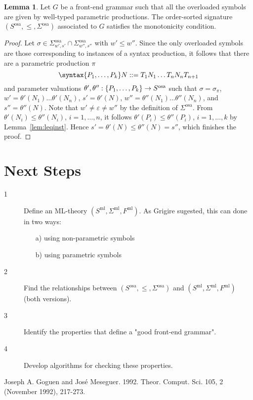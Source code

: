 \documentclass{article}
\theoremstyle{definition}
\theoremstyle{definition}
\theoremstyle{definition}
\theoremstyle{definition}
\theoremstyle{theorem}
\theoremstyle{theorem}
\theoremstyle{theorem}
\newtheorem{lemma}{Lemma}[section]
\theoremstyle{theorem}
\theoremstyle{theorem}
\begin{document}
{\begin{lemma}\label{lem:monotonicity}
Let $G$ be a front-end grammar such that all the overloaded symbols are given by well-typed parametric productions. The order-sorted signature $(S^\textrm{osa},\le, \Sigma^\textrm{osa})$ associated to $G$ satisfies the monotonicity condition.
\end{lemma}
\begin{proof}
Let $\sigma\in \Sigma^\textrm{osa}_{w',s'}\cap \Sigma^\textrm{osa}_{w'',s''}$ with $w'\le w''$.
Since the only overloaded symbols are those corresponding to instances of a syntax production, it follows that there are a parametric production $\pi$
\[
    \syntax\{P\sb{1},\ldots,P\sb{k}\} N ::= T\sb{1}N\sb{1}\ldots T\sb{n}N\sb{n}T\sb{n+1} 
\]
and parameter valuations $\theta',\theta'':\{P\sb{1},\ldots,P\sb{k}\}\to S^\textrm{osa}$  such that $\sigma=\sigma_\pi$, $w'=\theta'(N_1)\ldots\theta'(N_n)$, $s'=\theta'(N)$, $w''=\theta''(N_1)\ldots\theta''(N_n)$, and $s''=\theta''(N)$. Note that $w'\not=\varepsilon\not= w''$ by the definition of $\Sigma^\textrm{osa}$. 
From $\theta'(N_i)\le\theta''(N_i)$, $i=1,\ldots,n$, it follows $\theta'(P_i)\le \theta''(P_i)$, $i=1,\ldots,k$ by Lemma~\ref{lem:leqinst}. Hence $s'=\theta'(N)\le \theta''(N)=s''$, which finishes the proof.
\end{proof}

\section{Next Steps}

\begin{description}
\item[1] Define an ML-theory $(S^\textrm{ml},\Sigma^\textrm{ml},F^\textrm{ml})$. As Grigire sugested, this can done in two ways:
\begin{enumerate}
\item[a)] using non-parametric symbols
\item[b)] using parametric symbols
\end{enumerate}
\item[2] Find the relationships between $(S^\textrm{osa},\le, \Sigma^\textrm{osa})$ and  $(S^\textrm{ml},\Sigma^\textrm{ml},F^\textrm{ml})$ (both versions).
\item[3] Identify the properties that define a "good front-end grammar".
\item[4] Develop algorithms for checking these properties.
\end{description}
}

\begin{thebibliography}{ABC99a}

Joseph A. Goguen and José Meseguer. 1992. 
\newblock Theor. Comput. Sci. 105, 2 (November 1992), 217-273.

\end{thebibliography}
\end{document}
